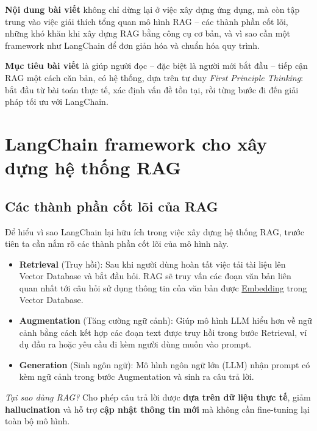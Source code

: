 \documentclass[11pt]{article}
\begin{document}
\vspace{0.5em}
\textbf{Nội dung bài viết} không chỉ dừng lại ở việc xây dựng ứng dụng, mà còn tập trung vào việc giải thích tổng quan mô hình RAG – các thành phần cốt lõi, những khó khăn khi xây dựng RAG bằng công cụ cơ bản, và vì sao cần một framework như LangChain để đơn giản hóa và chuẩn hóa quy trình.

\vspace{0.5em}
\textbf{Mục tiêu bài viết} là giúp người đọc – đặc biệt là người mới bắt đầu – tiếp cận RAG một cách căn bản, có hệ thống, dựa trên tư duy \textit{First Principle Thinking}: bắt đầu từ bài toán thực tế, xác định vấn đề tồn tại, rồi từng bước đi đến giải pháp tối ưu với LangChain.


\section{LangChain framework cho xây dựng hệ thống RAG}
\subsection{Các thành phần cốt lõi của RAG}
Để hiểu vì sao LangChain lại hữu ích trong việc xây dựng hệ thống RAG, trước tiên ta cần nắm rõ các thành phần cốt lõi của mô hình này.

\label{sec:rag_core}
\begin{itemize}
    \item \textbf{Retrieval} (Truy hồi): Sau khi người dùng hoàn tất việc tải tài liệu lên Vector Database và bắt đầu hỏi. RAG sẽ truy vấn các đoạn văn bản liên quan nhất tới câu hỏi sử dụng thông tin của văn bản được \hyperref[app:embedding]{Embedding} trong Vector Database.
    \item \textbf{Augmentation} (Tăng cường ngữ cảnh): Giúp mô hình LLM hiểu hơn về ngữ cảnh bằng cách kết hợp các đoạn text được truy hồi trong bước Retrieval, ví dụ đầu ra hoặc yêu cầu đi kèm người dùng muốn vào prompt.
    \item \textbf{Generation} (Sinh ngôn ngữ): Mô hình ngôn ngữ lớn (LLM) nhận prompt có kèm ngữ cảnh trong bước Augmentation và sinh ra câu trả lời.
\end{itemize}

\vspace{-0.5em}
\noindent
\textit{Tại sao dùng RAG?}
Cho phép câu trả lời được \textbf{dựa trên dữ liệu thực tế}, giảm \textbf{hallucination} và hỗ trợ \textbf{cập nhật thông tin mới} mà không cần fine-tuning lại toàn bộ mô hình. \\ \\
\end{document}
